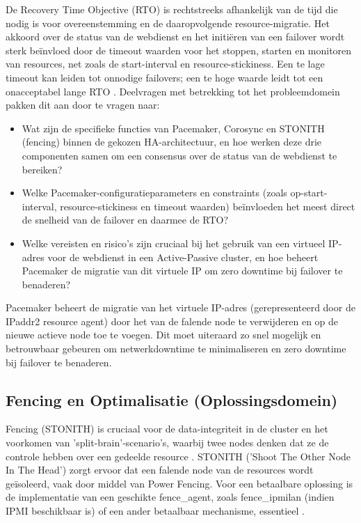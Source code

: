 De Recovery Time Objective (RTO) is rechtstreeks afhankelijk van de tijd die nodig is voor overeenstemming en de daaropvolgende resource-migratie. Het akkoord over de status van de webdienst en het initiëren van een failover wordt sterk beïnvloed door de timeout waarden voor het stoppen, starten en monitoren van resources, net zoals de start-interval en resource-stickiness. Een te lage timeout kan leiden tot onnodige failovers; een te hoge waarde leidt tot een onacceptabel lange RTO \autocite{Clusterlabs2024}. Deelvragen met betrekking tot het probleemdomein pakken dit aan door te vragen naar:

\begin{itemize}
    \item Wat zijn de specifieke functies van Pacemaker, Corosync en STONITH (fencing) binnen de gekozen HA-architectuur, en hoe werken deze drie componenten samen om een consensus over de status van de webdienst te bereiken?
    \item Welke Pacemaker-configuratieparameters en constraints (zoals op-start-interval, resource-stickiness en timeout waarden) beïnvloeden het meest direct de snelheid van de failover en daarmee de RTO?
    \item Welke vereisten en risico's zijn cruciaal bij het gebruik van een virtueel IP-adres voor de webdienst in een Active-Passive cluster, en hoe beheert Pacemaker de migratie van dit virtuele IP om zero downtime bij failover te benaderen?
\end{itemize}

Pacemaker beheert de migratie van het virtuele IP-adres (gerepresenteerd door de IPaddr2 resource agent) door het van de falende node te verwijderen en op de nieuwe actieve node toe te voegen. Dit moet uiteraard zo snel mogelijk en betrouwbaar gebeuren om netwerkdowntime te minimaliseren en zero downtime bij failover te benaderen.

\subsection{Fencing en Optimalisatie (Oplossingsdomein)}

Fencing (STONITH) is cruciaal voor de data-integriteit in de cluster en het voorkomen van 'split-brain'-scenario's, waarbij twee nodes denken dat ze de controle hebben over een gedeelde resource \autocite{RedHatPolicies025}. STONITH ('Shoot The Other Node In The Head') zorgt ervoor dat een falende node van de resources wordt geïsoleerd, vaak door middel van Power Fencing. Voor een betaalbare oplossing is de implementatie van een geschikte fence\_agent, zoals fence\_ipmilan (indien IPMI beschikbaar is) of een ander betaalbaar mechanisme, essentieel \autocite{Beekhof2025, RedHat2025}.
\medskip

